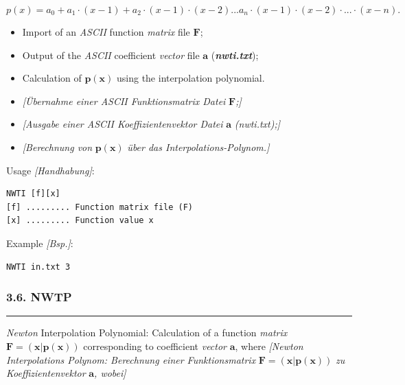 \documentclass[
]{article}
\begin{document}
\[p(x) = a_{0} + a_{1} \cdot (x - 1) + a_{2} \cdot (x - 1) \cdot (x - 2)...a_{n} \cdot (x - 1) \cdot (x - 2) \cdot ... \cdot (x - n).\]

\begin{itemize}
\item
  Import of an \emph{ASCII} function \emph{matrix} file \(\mathbf{F}\);
\item
  Output of the \emph{ASCII} coefficient \emph{vector} file
  \(\mathbf{a}\) (\textbf{\emph{nwti.txt}});
\item
  Calculation of \(\mathbf{p}\left( \mathbf{x} \right)\) using the
  interpolation polynomial.
\item
  \emph{{[}Übernahme einer ASCII Funktionsmatrix Datei}
  \(\mathbf{F}\)\emph{;{]}}
\item
  \emph{{[}Ausgabe einer ASCII Koeffizientenvektor Datei} \(\mathbf{a}\)
  \emph{(nwti.txt);{]}}
\item
  \emph{{[}Berechnung von} \(\mathbf{p}\left( \mathbf{x} \right)\)
  \emph{über das Interpolations-Polynom.{]}}
\end{itemize}

Usage \emph{{[}Handhabung{]}}:

\begin{verbatim}
NWTI [f][x]
[f] ......... Function matrix file (F)
[x] ......... Function value x
\end{verbatim}

Example \emph{{[}Bsp.{]}}:

\begin{verbatim}
NWTI in.txt 3
\end{verbatim}

\hypertarget{nwtp}{%
\subsubsection{3.6. NWTP}\label{nwtp}}

\begin{center}\rule{0.5\linewidth}{0.5pt}\end{center}

\emph{Newton} Interpolation Polynomial: Calculation of a function
\emph{matrix}
\(\mathbf{F =}\left( \mathbf{x|p}\left( \mathbf{x} \right) \right)\)
corresponding to coefficient \emph{vector} \(\mathbf{a}\), where
\emph{{[}Newton Interpolations Polynom: Berechnung einer
Funktionsmatrix}
\(\mathbf{F =}\left( \mathbf{x|p}\left( \mathbf{x} \right) \right)\)
\emph{zu Koeffizientenvektor} \(\mathbf{a}\)\emph{, wobei{]}}
\end{document}
